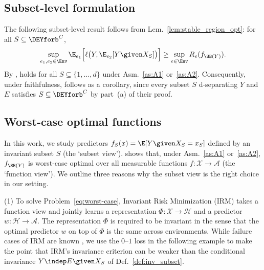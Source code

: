 \subsection{Subset-level formulation} \label{app:subset_formulation}

\begin{remark} \label{rem:subset_formulation}
The following subset-level result follows from Lem.~\ref{lem:stable_region_opt}: for all $S \subseteq \DEYforb^C$,
\begin{equation} \label{eq:rem8}
      \sup_{e_1, e_2 \in \Env}
  \E_{e_1} \Big[\ell \big(Y,  \E_{e_2}[Y \given X_S]\big)\Big]
  \geq
  \sup_{e \in \Env}
  R_e(f_{\SB(Y)}).
\end{equation}
By , 
holds for all
$S \subseteq \{1, \ldots, d\}$ under Asm.~\ref{as:A1} or~\ref{as:A2}.  Consequently, under faithfulness,
\citet[Thm.~3.5]{pfisterStabilizingVariableSelection2021}
follows as a corollary, since every subset $S$ d-separating $Y$ and $E$ satisfies $S \subseteq \DEYforb^C$ by part~(a) of their proof.
\end{remark}


\subsection{Worst-case optimal functions}\label{app:worst-case-opt-functions}
In this work, we study predictors $f_S(x) = \E[Y \given X_S = x_S]$ defined by an invariant subset $S$ (the `subset view').  shows that, under Asm.~\ref{as:A1} or~\ref{as:A2}, $f_{\SB(Y)}$ is worst-case optimal over all measurable functions $f\colon \mathcal{X} \to \mathcal{A}$ (the `function view'). We outline three reasons why the subset view is the right choice in our setting.

(1)
To solve Problem~\eqref{eq:worst-case}, Invariant Risk Minimization (IRM) \citep{arjovskyInvariantRiskMinimization2020} takes a function view and jointly learns a representation $\Phi\colon \mathcal{X} \to \mathcal{H}$ and a predictor $w\colon \mathcal{H} \to \mathcal{A}$. The representation $\Phi$ is required to be invariant in the sense that the optimal predictor $w$ on top of $\Phi$ is the same across environments. While failure cases of IRM are known \citep{rosenfeldRisksInvariantRisk2021, kamathDoesInvariantRisk2021}, we use the $0$--$1$ loss in the following example to make the point that IRM's invariance criterion can be weaker than the conditional invariance $Y \indep E \given X_S$ of Def.~\ref{def:inv_subset}.

